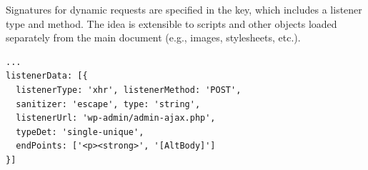 Signatures for dynamic requests are specified in the 
key, which includes a listener type and method. The idea is extensible
to scripts and other objects loaded separately from the main document
(e.g., images, stylesheets, etc.).

\lstset{basicstyle=\small}
\begin{lstlisting}[breaklines=true,caption={
      An example dynamic request signature. This patches CVE-2018-7747.
    },label={lst:dynamic_signature}]
...
listenerData: [{
  listenerType: 'xhr', listenerMethod: 'POST',
  sanitizer: 'escape', type: 'string',
  listenerUrl: 'wp-admin/admin-ajax.php',
  typeDet: 'single-unique',
  endPoints: ['<p><strong>', '[AltBody]']
}]
\end{lstlisting}

